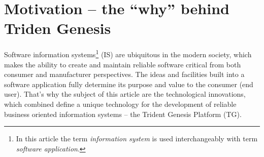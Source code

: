 \section{Motivation -- the ``why'' behind Triden Genesis}\label{sec:01}
  Software information systems\footnote{In this article the term \emph{information system} is used interchangeably with term \emph{software application}.} (IS) are ubiquitous in the modern society, which makes the ability to create and maintain reliable software critical from both consumer and manufacturer perspectives.
  The ideas and facilities built into a software application fully determine its purpose and value to the consumer (end user).
  That's why the subject of this article are the technological innovations, which combined define a unique technology for the development of reliable business oriented information systems -- the Trident Genesis Platform (TG).

